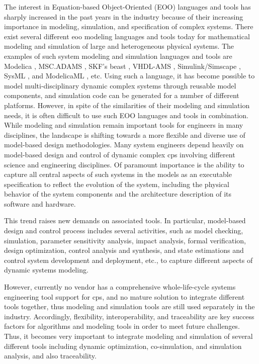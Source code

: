The interest in Equation-based Object-Oriented (EOO) languages and tools has sharply increased in the past years in the industry because of their increasing importance in modeling, simulation, and specification of complex systems. There exist several different \acrshort{eoo} modeling languages and tools today for mathematical modeling and simulation of large and heterogeneous physical systems. The examples of such system modeling and simulation languages and tools are Modelica \cite{modelica}, MSC.ADAMS \cite{adams}, SKF’s \acrshort{beast} \cite{beast}, VHDL-AMS \cite{vhdlamsernst, vhdlamsieee}, Simulink/Simscape \cite{simulink}, SysML \cite{sysml,sysmlmorgan}, and ModelicaML \cite{modelicamlreport, modelicaml}, etc. Using such a language, it has become possible to model multi-disciplinary dynamic complex systems through reusable model components, and simulation code can be generated for a number of different platforms. However, in spite of the similarities of their modeling and simulation needs, it is often difficult to use such EOO languages and tools in combination.
While modeling and simulation remain important tools for engineers in many disciplines, the landscape is shifting towards a more flexible and diverse use of model-based design methodologies. Many system engineers depend heavily on model-based design and control of dynamic complex \acrshort{cps} involving different science and engineering disciplines. Of paramount importance is the ability to capture all central aspects of such systems in the models as an executable specification to reflect the evolution of the system, including the physical behavior of the system components and the architecture description of its software and hardware. 

This trend raises new demands on associated tools. In particular, model-based design and control process includes several activities, such as model checking, simulation, parameter sensitivity analysis, impact analysis, formal verification, design optimization, control analysis and synthesis, and state estimations and control system development and deployment, etc., to capture different aspects of dynamic systems modeling.

However, currently no vendor has a comprehensive whole-life-cycle systems engineering tool support for \acrshort{cps}, and no mature solution to integrate different tools together, thus modeling and simulation tools are still used separately in the industry. Accordingly, flexibility, interoperability, and traceability are key success factors for algorithms and modeling tools in order to meet future challenges. Thus, it becomes very important to integrate modeling and simulation of several different tools including dynamic optimization, co-simulation, and simulation analysis, and also traceability.


